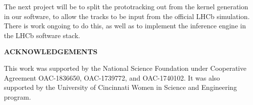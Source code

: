 \documentclass[10pt, paper=a4, UKenglish]{article}
\def\Acknowledgements{\bigskip  \bigskip \begin{center} \begin{large}
      \bf ACKNOWLEDGEMENTS \end{large}\end{center}}
\begin{document}
The next project will be to split the prototracking out from the kernel generation in our software, to allow the tracks to be input from the official LHCb simulation. There is work ongoing to do this, as well as to implement the inference engine in the LHCb software stack.


 

\Acknowledgements
This work was supported by the National Science Foundation under Cooperative Agreement OAC-1836650, OAC-1739772, and OAC-1740102. It was also supported by the University of Cincinnati Women in Science and Engineering program.










\end{document}
